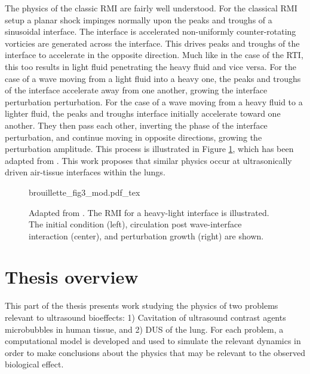 The physics of the classic \ac{RMI} are fairly well understood. For
the classical \ac{RMI} setup a planar shock impinges normally upon the
peaks and troughs of a sinusoidal interface. The interface is
accelerated non-uniformly counter-rotating vorticies are generated
across the interface. This drives peaks and troughs of the interface
to accelerate in the opposite direction. Much like in the case of the
\ac{RTI}, this too results in light fluid penetrating the
heavy fluid and vice versa. For the case of a wave moving from a light
fluid into a heavy one, the peaks and troughs of the interface
accelerate away from one another, growing the interface perturbation
perturbation. For the case of a wave moving from a heavy fluid to a
lighter fluid, the peaks and troughs interface initially accelerate
toward one another. They then pass each other, inverting the phase of
the interface perturbation, and continue moving in opposite
directions, growing the perturbation amplitude. This process is
illustrated in Figure \ref{fig:rmi_schematic}, which has been adapted
from \cite{Brouillette2002}. This work proposes that similar physics
occur at ultrasonically driven air-tissue interfaces within the lungs.
\begin{figure}
  \centering
  \def\svgwidth{0.9\textwidth}
  {brouillette_fig3_mod.pdf_tex} \hfill%
  \caption[A schematic view of the \acl{RMI} instability for a
  heavy-light interface]{Adapted from \cite{Brouillette2002}. The
    \ac{RMI} for a heavy-light interface is illustrated. The initial
    condition (left), circulation post wave-interface interaction
    (center), and perturbation growth (right) are shown.}
  \label{fig:rmi_schematic}
\end{figure}
 
\section{Thesis overview}
This part of the thesis presents work studying the physics of two
problems relevant to ultrasound bioeffects: 1) Cavitation of
ultrasound contrast agents microbubbles in human tissue, and 2)
\ac{DUS} of the lung. For each problem, a computational model is
developed and used to simulate the relevant dynamics in order to make
conclusions about the physics that may be relevant to the observed
biological effect.


